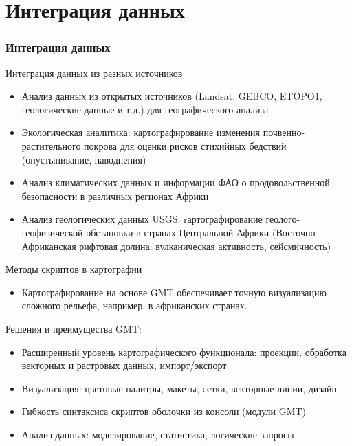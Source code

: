 \documentclass[pdflatex,compress,8pt,
	xcolor={dvipsnames,dvipsnames,svgnames,x11names,table},
	hyperref={colorlinks = true, breaklinks = true, urlcolor = NavyBlue, linkcolor=white, breaklinks = true}]{beamer}
\begin{document}
\section{Интеграция данных}
\begin{frame}\frametitle{Интеграция данных}
 
\begin{alertblock}{Интеграция данных из разных источников}
 \begin{itemize}\footnotesize
 \item Анализ данных из открытых источников (Landsat, GEBCO, ETOPO1, геологические данные и т.д.) для географического анализа
\item Экологическая аналитика: картографирование изменения почвенно-растительного покрова для оценки рисков стихийных бедствий (опустынивание, наводнения) 
\item Анализ климатических данных и информации ФАО о продовольственной безопасности в различных регионах Африки
\item Анализ геологических данных USGS: rартографирование геолого-геофизической обстановки в странах Центральной Африки (Восточно-Африканская рифтовая долина: вулканическая активность, сейсмичность)
    \end{itemize}
\end{alertblock}

\begin{exampleblock}{Методы скриптов в картографии}
\begin{itemize}\footnotesize
        	\item Картографирование на основе GMT обеспечивает точную визуализацию сложного рельефа, например, в африканских странах.
\end{itemize}
\end{exampleblock}
	
\begin{alertblock}{Решения и преимущества GMT:}\footnotesize
 \begin{itemize}
\item Расширенный уровень картографического функционала: проекции, обработка векторных и растровых данных, импорт/экспорт
\item Визуализация: цветовые палитры, макеты, сетки, векторные линии, дизайн
\item Гибкость синтаксиса скриптов оболочки из консоли (модули GMT)
\item Анализ данных: моделирование, статистика, логические запросы
\end{itemize}
\end{alertblock}
\end{frame}
\end{document}
